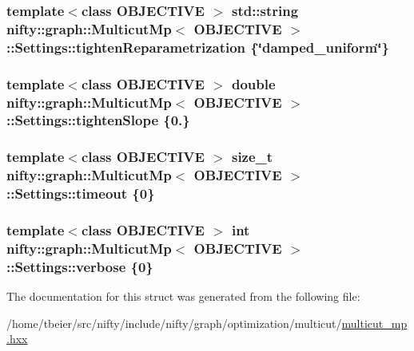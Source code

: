 \subsubsection[{tighten\+Reparametrization}]{\setlength{\rightskip}{0pt plus 5cm}template$<$class O\+B\+J\+E\+C\+T\+I\+V\+E $>$ std\+::string {\bf nifty\+::graph\+::\+Multicut\+Mp}$<$ O\+B\+J\+E\+C\+T\+I\+V\+E $>$\+::Settings\+::tighten\+Reparametrization \{\char`\"{}damped\+\_\+uniform\char`\"{}\}}\label{structnifty_1_1graph_1_1MulticutMp_1_1Settings_a6db3ed7ee4b13dfd7f1951b1e79ff88f}
\hypertarget{structnifty_1_1graph_1_1MulticutMp_1_1Settings_a848067bdc2e6dab77b81c37b3a08e7b8}{}
\subsubsection[{tighten\+Slope}]{\setlength{\rightskip}{0pt plus 5cm}template$<$class O\+B\+J\+E\+C\+T\+I\+V\+E $>$ double {\bf nifty\+::graph\+::\+Multicut\+Mp}$<$ O\+B\+J\+E\+C\+T\+I\+V\+E $>$\+::Settings\+::tighten\+Slope \{0.\}}\label{structnifty_1_1graph_1_1MulticutMp_1_1Settings_a848067bdc2e6dab77b81c37b3a08e7b8}
\hypertarget{structnifty_1_1graph_1_1MulticutMp_1_1Settings_ae6d8b948580badc87dab916a526760c9}{}
\subsubsection[{timeout}]{\setlength{\rightskip}{0pt plus 5cm}template$<$class O\+B\+J\+E\+C\+T\+I\+V\+E $>$ size\+\_\+t {\bf nifty\+::graph\+::\+Multicut\+Mp}$<$ O\+B\+J\+E\+C\+T\+I\+V\+E $>$\+::Settings\+::timeout \{0\}}\label{structnifty_1_1graph_1_1MulticutMp_1_1Settings_ae6d8b948580badc87dab916a526760c9}
\hypertarget{structnifty_1_1graph_1_1MulticutMp_1_1Settings_abd9dd350bedf9464118338645a49182c}{}
\subsubsection[{verbose}]{\setlength{\rightskip}{0pt plus 5cm}template$<$class O\+B\+J\+E\+C\+T\+I\+V\+E $>$ int {\bf nifty\+::graph\+::\+Multicut\+Mp}$<$ O\+B\+J\+E\+C\+T\+I\+V\+E $>$\+::Settings\+::verbose \{0\}}\label{structnifty_1_1graph_1_1MulticutMp_1_1Settings_abd9dd350bedf9464118338645a49182c}


The documentation for this struct was generated from the following file\+:\begin{DoxyCompactItemize}
\item 
/home/tbeier/src/nifty/include/nifty/graph/optimization/multicut/\hyperlink{multicut__mp_8hxx}{multicut\+\_\+mp.\+hxx}\end{DoxyCompactItemize}

